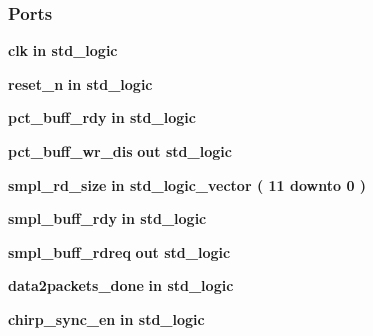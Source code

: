 \subsubsection*{Ports}
 \begin{DoxyCompactItemize}
\item 
{\bf clk}  {\bfseries {\bfseries \textcolor{keywordflow}{in}\textcolor{vhdlchar}{ }}} {\bfseries \textcolor{comment}{std\+\_\+logic}\textcolor{vhdlchar}{ }} 
\item 
{\bf reset\+\_\+n}  {\bfseries {\bfseries \textcolor{keywordflow}{in}\textcolor{vhdlchar}{ }}} {\bfseries \textcolor{comment}{std\+\_\+logic}\textcolor{vhdlchar}{ }} 
\item 
{\bf pct\+\_\+buff\+\_\+rdy}  {\bfseries {\bfseries \textcolor{keywordflow}{in}\textcolor{vhdlchar}{ }}} {\bfseries \textcolor{comment}{std\+\_\+logic}\textcolor{vhdlchar}{ }} 
\item 
{\bf pct\+\_\+buff\+\_\+wr\+\_\+dis}  {\bfseries {\bfseries \textcolor{keywordflow}{out}\textcolor{vhdlchar}{ }}} {\bfseries \textcolor{comment}{std\+\_\+logic}\textcolor{vhdlchar}{ }} 
\item 
{\bf smpl\+\_\+rd\+\_\+size}  {\bfseries {\bfseries \textcolor{keywordflow}{in}\textcolor{vhdlchar}{ }}} {\bfseries \textcolor{comment}{std\+\_\+logic\+\_\+vector}\textcolor{vhdlchar}{ }\textcolor{vhdlchar}{(}\textcolor{vhdlchar}{ }\textcolor{vhdlchar}{ } \textcolor{vhdldigit}{11} \textcolor{vhdlchar}{ }\textcolor{keywordflow}{downto}\textcolor{vhdlchar}{ }\textcolor{vhdlchar}{ } \textcolor{vhdldigit}{0} \textcolor{vhdlchar}{ }\textcolor{vhdlchar}{)}\textcolor{vhdlchar}{ }} 
\item 
{\bf smpl\+\_\+buff\+\_\+rdy}  {\bfseries {\bfseries \textcolor{keywordflow}{in}\textcolor{vhdlchar}{ }}} {\bfseries \textcolor{comment}{std\+\_\+logic}\textcolor{vhdlchar}{ }} 
\item 
{\bf smpl\+\_\+buff\+\_\+rdreq}  {\bfseries {\bfseries \textcolor{keywordflow}{out}\textcolor{vhdlchar}{ }}} {\bfseries \textcolor{comment}{std\+\_\+logic}\textcolor{vhdlchar}{ }} 
\item 
{\bf data2packets\+\_\+done}  {\bfseries {\bfseries \textcolor{keywordflow}{in}\textcolor{vhdlchar}{ }}} {\bfseries \textcolor{comment}{std\+\_\+logic}\textcolor{vhdlchar}{ }} 
\item 
{\bf chirp\+\_\+sync\+\_\+en}  {\bfseries {\bfseries \textcolor{keywordflow}{in}\textcolor{vhdlchar}{ }}} {\bfseries \textcolor{comment}{std\+\_\+logic}\textcolor{vhdlchar}{ }} 
\end{DoxyCompactItemize}


